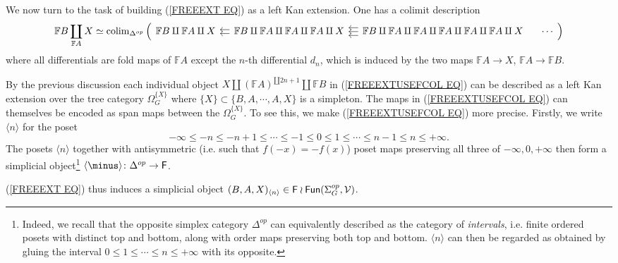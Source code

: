 \documentclass[a4paper,10pt]{article}%
\begin{document}
We now turn to the task of building (\ref{FREEEXT EQ})
as a left Kan extension. One has a colimit description
\begin{equation}\label{FREEEXTUSEFCOL EQ}
	\mathbb{F} B \coprod_{\mathbb{F} A} X
\simeq
	\colim_{\Delta^{op}} \left(
\begin{tikzcd}[column sep = 1em]
	\mathbb{F} B \amalg \mathbb{F} A \amalg X &
	\mathbb{F} B \amalg \mathbb{F} A \amalg \mathbb{F} A \amalg \mathbb{F} A  \amalg X
	\ar[l,shift left=2pt] \ar[l,shift left=-2pt] &	
	\mathbb{F} B \amalg \mathbb{F} A \amalg \mathbb{F} A \amalg \mathbb{F} A \amalg \mathbb{F} A \amalg \mathbb{F} A  \amalg X
	\ar[l,shift left=4pt] \ar[l,shift left=-4pt]  \ar[l] &
	\cdots
\end{tikzcd}
	\right)
\end{equation}
where all differentials are fold maps of $\mathbb{F} A$ except the $n$-th differential $d_n$, which is induced by the two maps $\mathbb{F}A \to X$, $\mathbb{F}A \to \mathbb{F}B$.

By the previous discussion each individual object 
$X \amalg (\mathbb{F}A)^{\amalg 2n+1} \amalg \mathbb{F}B$ in
(\ref{FREEEXTUSEFCOL EQ})
can be described as a left Kan extension over the tree category 
$\Omega_{G}^{\{X\}}$ where 
$\{X\} \subset \{B,A,\cdots,A,X\}$ is a simpleton.
The maps in (\ref{FREEEXTUSEFCOL EQ}) can themselves be encoded as span maps between the $\Omega_{G}^{\{X\}}$.
To see this, we make (\ref{FREEEXTUSEFCOL EQ}) more precise.
Firstly, we write $\langle n \rangle$ for the poset
\[
	- \infty \leq -n \leq -n+1 \leq
\cdots
	\leq -1 \leq 0 \leq 1 \leq
\cdots
	\leq n-1 \leq n \leq + \infty.
\]
The posets $\langle n \rangle$ together with antisymmetric (i.e. such that $f(-x)=-f(x)$) poset maps preserving all three of $-\infty, 0, +\infty$
then form a simplicial object\footnote{Indeed, we recall that the opposite simplex category $\Delta^{op}$ can equivalently described as the category of \textit{intervals}, i.e. finite ordered posets with distinct top and bottom, along with order maps preserving both top and bottom.
$\langle n \rangle$ can then be regarded as obtained by gluing the interval $0\leq 1 \leq \cdots \leq n \leq + \infty$ with its opposite.}
$\langle \minus \rangle \colon \Delta^{op} \to \Fin$.


(\ref{FREEEXT EQ}) thus induces a simplicial object
$(B,A,X)_{\langle n \rangle} \in \mathsf{F} \wr \mathsf{Fun}(\Sigma_G^{op}, \mathcal{V})$.
\end{document}
